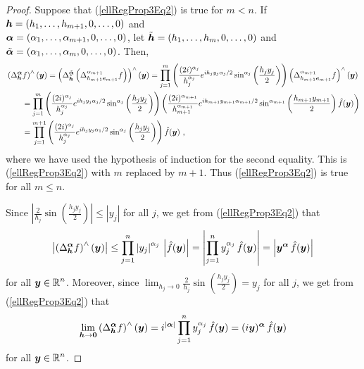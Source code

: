 \begin{proof}
Suppose that (\ref{ellRegProp3Eq2}) is true for $m < n$.  If
${\bm{h}} = (h_1,\ldots,h_{m+1},0,\ldots,0)$ and\\
${\bm{\alpha}} = (\alpha_1,\ldots,\alpha_{m+1},0,\ldots,0)$, let
$\tilde{{\bm{h}}} = (h_1,\ldots,h_m,0,\ldots,0)$ and
$\tilde{{\bm{\alpha}}} = (\alpha_1,\ldots,\alpha_m,0,\ldots,0)$.  Then,
\begin{align*}
&\left(\Delta^{\VEC{\alpha}}_{\VEC{h}} f \right)^\wedge(\VEC{y})
= \left( \Delta^{\tilde{\VEC{\alpha}}}_{\tilde{\VEC{h}}}
\left( \Delta^{\alpha_{m+1}}_{h_{m+1}\VEC{e}_{m+1}} f \right)\right)^\wedge
(\VEC{y})
= \prod_{j=1}^m \left(\frac{(2i)^{\alpha_j}}{h_j^{\alpha_j}}
e^{i h_j y_j \alpha_j/2}
\sin^{\alpha_j}\left(\frac{h_j y_j}{2}\right) \right)
\left( \Delta^{\alpha_{m+1}}_{h_{m+1}\VEC{e}_{m+1}} f \right)^\wedge(\VEC{y}) \\
&\qquad
= \prod_{j=1}^m \left(\frac{(2i)^{\alpha_j}}{h_j^{\alpha_j}}
e^{i h_j y_j \alpha_j/2}
\sin^{\alpha_j}\left(\frac{h_j y_j}{2}\right) \right)
\left( \frac{(2i)^{\alpha_{m+1}}}{h_{m+1}^{\alpha_{m+1}}}
e^{i h_{m+1} y_{m+1} \alpha_{m+1}/2}
\sin^{\alpha_{m+1}}\left(\frac{h_{m+1} y_{m+1}}{2}\right)
\hat{f}(\VEC{y}) \right) \\
&\qquad
=\prod_{j=1}^{m+1} \left(\frac{(2i)^{\alpha_j}}{h_j^{\alpha_j}}
e^{i h_j y_j \alpha_1/2}
\sin^{\alpha_j}\left(\frac{h_j y_j}{2}\right) \right)\hat{f}(\VEC{y}) \ ,
\end{align*}
where we have used the hypothesis of induction for the second equality.
This is (\ref{ellRegProp3Eq2}) with $m$ replaced by $m+1$.
Thus (\ref{ellRegProp3Eq2}) is true for all $m \leq n$.

Since $\displaystyle \left| \frac{2}{h_j}
\sin\left(\frac{h_j y_j}{2}\right)\right| \leq |y_j|$ for all $j$, we
get from (\ref{ellRegProp3Eq2}) that
\begin{equation} \label{ellRegProp3Eq3}
\left| \left(\Delta^{{\bm{\alpha}}}_{{\bm{h}}} f\right)^\wedge({\bm{y}}) \right|
\leq \prod_{j=1}^n \left| y_j \right|^{\alpha_j}
\,\left| \hat{f}({\bm{y}})\right|
= \left| \prod_{j=1}^n y_j^{\alpha_j} \,\hat{f}({\bm{y}})\right|
= \left| {\bm{y}}^{{\bm{\alpha}}} \,\hat{f}({\bm{y}})\right|
\end{equation}
for all $\displaystyle {\bm{y}} \in \mathbb{R}^n$.  Moreover, since
$\displaystyle \lim_{h_j \to 0} \frac{2}{h_j} \sin\left(\frac{h_j y_j}{2}\right)
= y_j$ for all $j$, we get from (\ref{ellRegProp3Eq2}) that
\begin{equation} \label{ellRegProp3Eq4}
\lim_{{\bm{h}}\to {\bm{0}}}  \left(\Delta^{{\bm{\alpha}}}_{{\bm{h}}}
f\right)^\wedge({\bm{y}})
= i^{|{\bm{\alpha}}|} \prod_{j=1}^n y_j^{\alpha_j} \,\hat{f}({\bm{y}})
= (i{\bm{y}})^{{\bm{\alpha}}} \,\hat{f}({\bm{y}})
\end{equation}
for all $\displaystyle {\bm{y}} \in \mathbb{R}^n$.


\end{proof}
